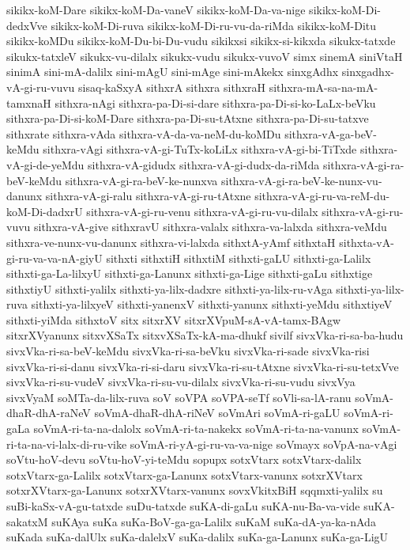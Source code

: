 {sikikx-koM-Dare
sikikx-koM-Da-vaneV
sikikx-koM-Da-va-nige
sikikx-koM-Di-dedxVve
sikikx-koM-Di-ruva
sikikx-koM-Di-ru-vu-da-riMda
sikikx-koM-Ditu
sikikx-koMDu
sikikx-koM-Du-bi-Du-vudu
sikikxsi
sikikx-si-kikxda
sikukx-tatxde
sikukx-tatxleV
sikukx-vu-dilalx
sikukx-vudu
sikukx-vuvoV
simx
sinemA
siniVtaH
sinimA
sini-mA-dalilx
sini-mAgU
sini-mAge
sini-mAkekx
sinxgAdhx
sinxgadhx-vA-gi-ru-vuvu
sisaq-kaSxyA
sithxrA
sithxra
sithxraH
sithxra-mA-sa-na-mA-tamxnaH
sithxra-nAgi
sithxra-pa-Di-si-dare
sithxra-pa-Di-si-ko-LaLx-beVku
sithxra-pa-Di-si-koM-Dare
sithxra-pa-Di-su-tAtxne
sithxra-pa-Di-su-tatxve
sithxrate
sithxra-vAda
sithxra-vA-da-va-neM-du-koMDu
sithxra-vA-ga-beV-keMdu
sithxra-vAgi
sithxra-vA-gi-TuTx-koLiLx
sithxra-vA-gi-bi-TiTxde
sithxra-vA-gi-de-yeMdu
sithxra-vA-gidudx
sithxra-vA-gi-dudx-da-riMda
sithxra-vA-gi-ra-beV-keMdu
sithxra-vA-gi-ra-beV-ke-nunxva
sithxra-vA-gi-ra-beV-ke-nunx-vu-danunx
sithxra-vA-gi-ralu
sithxra-vA-gi-ru-tAtxne
sithxra-vA-gi-ru-va-reM-du-koM-Di-dadxrU
sithxra-vA-gi-ru-venu
sithxra-vA-gi-ru-vu-dilalx
sithxra-vA-gi-ru-vuvu
sithxra-vA-give
sithxravU
sithxra-valalx
sithxra-va-lalxda
sithxra-veMdu
sithxra-ve-nunx-vu-danunx
sithxra-vi-lalxda
sithxtA-yAmf
sithxtaH
sithxta-vA-gi-ru-va-va-nA-giyU
sithxti
sithxtiH
sithxtiM
sithxti-gaLU
sithxti-ga-Lalilx
sithxti-ga-La-lilxyU
sithxti-ga-Lanunx
sithxti-ga-Lige
sithxti-gaLu
sithxtige
sithxtiyU
sithxti-yalilx
sithxti-ya-lilx-dadxre
sithxti-ya-lilx-ru-vAga
sithxti-ya-lilx-ruva
sithxti-ya-lilxyeV
sithxti-yanenxV
sithxti-yanunx
sithxti-yeMdu
sithxtiyeV
sithxti-yiMda
sithxtoV
sitx
sitxrXV
sitxrXVpuM-sA-vA-tamx-BAgw
sitxrXVyanunx
sitxvXSaTx
sitxvXSaTx-kA-ma-dhukf
sivilf
sivxVka-ri-sa-ba-hudu
sivxVka-ri-sa-beV-keMdu
sivxVka-ri-sa-beVku
sivxVka-ri-sade
sivxVka-risi
sivxVka-ri-si-danu
sivxVka-ri-si-daru
sivxVka-ri-su-tAtxne
sivxVka-ri-su-tetxVve
sivxVka-ri-su-vudeV
sivxVka-ri-su-vu-dilalx
sivxVka-ri-su-vudu
sivxVya
sivxVyaM
soMTa-da-lilx-ruva
soV
soVPA
soVPA-seTf
soVli-sa-lA-ranu
soVmA-dhaR-dhA-raNeV
soVmA-dhaR-dhA-riNeV
soVmAri
soVmA-ri-gaLU
soVmA-ri-gaLa
soVmA-ri-ta-na-dalolx
soVmA-ri-ta-nakekx
soVmA-ri-ta-na-vanunx
soVmA-ri-ta-na-vi-lalx-di-ru-vike
soVmA-ri-yA-gi-ru-va-va-nige
soVmayx
soVpA-na-vAgi
soVtu-hoV-devu
soVtu-hoV-yi-teMdu
sopupx
sotxVtarx
sotxVtarx-dalilx
sotxVtarx-ga-Lalilx
sotxVtarx-ga-Lanunx
sotxVtarx-vanunx
sotxrXVtarx
sotxrXVtarx-ga-Lanunx
sotxrXVtarx-vanunx
sovxVkitxBiH
sqqmxti-yalilx
su
suBi-kaSx-vA-gu-tatxde
suDu-tatxde
suKA-di-gaLu
suKA-nu-Ba-va-vide
suKA-sakatxM
suKAya
suKa
suKa-BoV-ga-ga-Lalilx
suKaM
suKa-dA-ya-ka-nAda
suKada
suKa-dalUlx
suKa-dalelxV
suKa-dalilx
suKa-ga-Lanunx
suKa-ga-LigU
}
